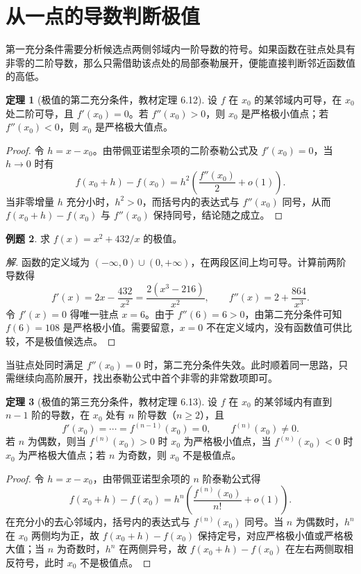 \documentclass[UTF8,fontset=fandol,a4paper,12pt]{ctexart}
\theoremstyle{definition}
\newtheorem{theorem}{定理}[section]
\newtheorem{example}[theorem]{例题}
\begin{document}
\section{从一点的导数判断极值}
第一充分条件需要分析候选点两侧邻域内一阶导数的符号。如果函数在驻点处具有非零的二阶导数，那么只需借助该点处的局部泰勒展开，便能直接判断邻近函数值的高低。

\begin{theorem}[极值的第二充分条件，教材定理 6.12]
设 $f$ 在 $x_0$ 的某邻域内可导，在 $x_0$ 处二阶可导，且 $f'(x_0)=0$。若 $f''(x_0)>0$，则 $x_0$ 是严格极小值点；若 $f''(x_0)<0$，则 $x_0$ 是严格极大值点。
\end{theorem}

\begin{proof}
令 $h=x-x_0$。由带佩亚诺型余项的二阶泰勒公式及 $f'(x_0)=0$，当 $h\to0$ 时有
\[
 f(x_0+h)-f(x_0)=h^2\left(\frac{f''(x_0)}{2}+o(1)\right).
\]
当非零增量 $h$ 充分小时，$h^2>0$，而括号内的表达式与 $f''(x_0)$ 同号，从而 $f(x_0+h)-f(x_0)$ 与 $f''(x_0)$ 保持同号，结论随之成立。
\end{proof}

\begin{example}
求 $f(x)=x^2+432/x$ 的极值。
\end{example}

\begin{proof}[解]
函数的定义域为 $(-\infty,0)\cup(0,+\infty)$，在两段区间上均可导。计算前两阶导数得
\[
 f'(x)=2x-\frac{432}{x^2}=\frac{2(x^3-216)}{x^2},
 \qquad f''(x)=2+\frac{864}{x^3}.
\]
令 $f'(x)=0$ 得唯一驻点 $x=6$。由于 $f''(6)=6>0$，由第二充分条件可知 $f(6)=108$ 是严格极小值。需要留意，$x=0$ 不在定义域内，没有函数值可供比较，不是极值候选点。
\end{proof}

当驻点处同时满足 $f''(x_0)=0$ 时，第二充分条件失效。此时顺着同一思路，只需继续向高阶展开，找出泰勒公式中首个非零的非常数项即可。

\begin{theorem}[极值的第三充分条件，教材定理 6.13]
设 $f$ 在 $x_0$ 的某邻域内有直到 $n-1$ 阶的导数，在 $x_0$ 处有 $n$ 阶导数（$n\ge2$），且
\[
 f'(x_0)=\cdots=f^{(n-1)}(x_0)=0,\qquad f^{(n)}(x_0)\ne0.
\]
若 $n$ 为偶数，则当 $f^{(n)}(x_0)>0$ 时 $x_0$ 为严格极小值点，当 $f^{(n)}(x_0)<0$ 时 $x_0$ 为严格极大值点；若 $n$ 为奇数，则 $x_0$ 不是极值点。
\end{theorem}

\begin{proof}
令 $h=x-x_0$，由带佩亚诺型余项的 $n$ 阶泰勒公式得
\[
 f(x_0+h)-f(x_0)=h^n\left(\frac{f^{(n)}(x_0)}{n!}+o(1)\right).
\]
在充分小的去心邻域内，括号内的表达式与 $f^{(n)}(x_0)$ 同号。当 $n$ 为偶数时，$h^n$ 在 $x_0$ 两侧均为正，故 $f(x_0+h)-f(x_0)$ 保持定号，对应严格极小值或严格极大值；当 $n$ 为奇数时，$h^n$ 在两侧异号，故 $f(x_0+h)-f(x_0)$ 在左右两侧取相反符号，此时 $x_0$ 不是极值点。
\end{proof}
\end{document}
